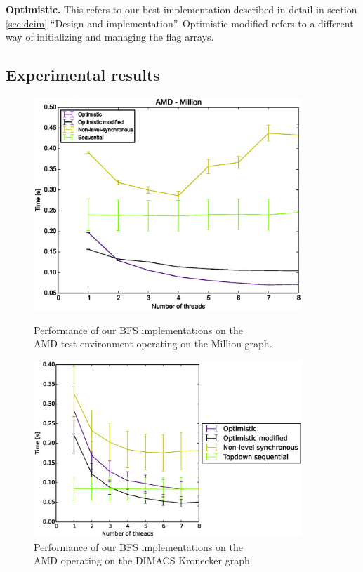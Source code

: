 \documentclass[letterpaper]{article}
\newcommand{\mypar}[1]{{\bf #1.}} %
\begin{document}
		\mypar{Optimistic}
		This refers to our best implementation described in detail in section \ref{sec:deim} ``Design and implementation''.
		Optimistic modified refers to a different way of initializing and managing the flag arrays.



	\subsection{Experimental results}

		\begin{figure}
			\centering
			\begin{minipage}{.5\textwidth}
				\centering
	  			\includegraphics[width=0.9\textwidth]{amd_million.eps}
	  			\vspace*{-0.3cm}
	  			\caption[caption]{Performance of our BFS implementations on the \\ \hspace{\textwidth} AMD test environment operating on the Million graph.\label{fig:amdbig}}
			\end{minipage}%
			\begin{minipage}{.5\textwidth}
				\centering
	  			\includegraphics[width=0.9\textwidth]{amd_dimacskron.eps}
	  			\vspace*{-0.3cm}
	  			\caption[caption]{Performance of our BFS implementations on the \\ \hspace{\textwidth} AMD operating on the DIMACS Kronecker graph.\label{fig:amdkron}}
			\end{minipage}%
		\end{figure}
		
\end{document}
